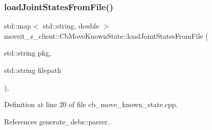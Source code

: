 \subsubsection{\texorpdfstring{load\+Joint\+States\+From\+File()}{loadJointStatesFromFile()}}
{\footnotesize\ttfamily std\+::map$<$ std\+::string, double $>$ moveit\+\_\+z\+\_\+client\+::\+Cb\+Move\+Known\+State\+::load\+Joint\+States\+From\+File (\begin{DoxyParamCaption}\item[{std\+::string}]{pkg,  }\item[{std\+::string}]{filepath }\end{DoxyParamCaption})\hspace{0.3cm}{\ttfamily [static]}, {\ttfamily [private]}}



Definition at line 20 of file cb\+\_\+move\+\_\+known\+\_\+state.\+cpp.



References generate\+\_\+debs\+::parser.


